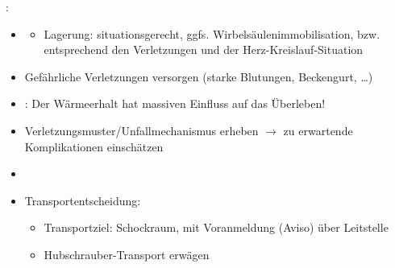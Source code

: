 {%
: 


\begin{itemize}
  \item \TxMassVitMKBes
  \begin{itemize}
    \item Lagerung: situationsgerecht, ggfs.
    Wirbelsäulenimmobilisation, bzw. entsprechend den
    Verletzungen und der Herz-Kreislauf-Situation
  \end{itemize}
  \item Gefährliche Verletzungen versorgen (starke
  Blutungen, Beckengurt, \ldots) 
  \item {}: Der Wärmeerhalt hat massiven Einfluss auf das
  Überleben!
  \item Verletzungsmuster/Unfallmechanismus erheben $\rightarrow$ zu 
  erwartende Komplikationen einschätzen
  \item {}
  \item Transportentscheidung:
  \begin{itemize}
    \item Transportziel: Schockraum, mit Voranmeldung
    (Aviso) über Leitstelle
    \item Hubschrauber-Transport erwägen
  \end{itemize}
\end{itemize}
}

